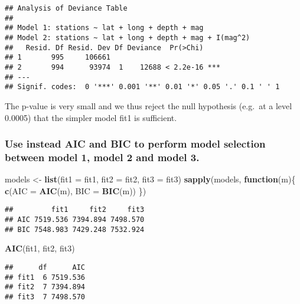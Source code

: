 \documentclass[
]{article}
\newenvironment{Shaded}{\begin{snugshade}}{\end{snugshade}}
\newcommand{\ControlFlowTok}[1]{\textcolor[rgb]{0.13,0.29,0.53}{\textbf{#1}}}
\newcommand{\DataTypeTok}[1]{\textcolor[rgb]{0.13,0.29,0.53}{#1}}
\newcommand{\KeywordTok}[1]{\textcolor[rgb]{0.13,0.29,0.53}{\textbf{#1}}}
\newcommand{\NormalTok}[1]{#1}
\newcommand{\StringTok}[1]{\textcolor[rgb]{0.31,0.60,0.02}{#1}}
\begin{document}
\begin{verbatim}
## Analysis of Deviance Table
## 
## Model 1: stations ~ lat + long + depth + mag
## Model 2: stations ~ lat + long + depth + mag + I(mag^2)
##   Resid. Df Resid. Dev Df Deviance  Pr(>Chi)    
## 1       995     106661                          
## 2       994      93974  1    12688 < 2.2e-16 ***
## ---
## Signif. codes:  0 '***' 0.001 '**' 0.01 '*' 0.05 '.' 0.1 ' ' 1
\end{verbatim}

The p-value is very small and we thus reject the null hypothesis
(e.g.~at a level 0.0005) that the simpler model fit1 is sufficient.

\hypertarget{use-instead-aic-and-bic-to-perform-model-selection-between-model-1-model-2-and-model-3.}{%
\subsubsection{Use instead AIC and BIC to perform model selection
between model 1, model 2 and model
3.}\label{use-instead-aic-and-bic-to-perform-model-selection-between-model-1-model-2-and-model-3.}}

\begin{Shaded}
\begin{Highlighting}[]
\NormalTok{models <-}\StringTok{ }\KeywordTok{list}\NormalTok{(}\DataTypeTok{fit1 =}\NormalTok{ fit1, }\DataTypeTok{fit2 =}\NormalTok{ fit2, }\DataTypeTok{fit3 =}\NormalTok{ fit3)}
\KeywordTok{sapply}\NormalTok{(models, }\ControlFlowTok{function}\NormalTok{(m)\{}
  \KeywordTok{c}\NormalTok{(}\DataTypeTok{AIC =} \KeywordTok{AIC}\NormalTok{(m), }\DataTypeTok{BIC =} \KeywordTok{BIC}\NormalTok{(m))}
\NormalTok{\})}
\end{Highlighting}
\end{Shaded}

\begin{verbatim}
##         fit1     fit2     fit3
## AIC 7519.536 7394.894 7498.570
## BIC 7548.983 7429.248 7532.924
\end{verbatim}

\begin{Shaded}
\begin{Highlighting}[]
\KeywordTok{AIC}\NormalTok{(fit1, fit2, fit3)}
\end{Highlighting}
\end{Shaded}

\begin{verbatim}
##      df      AIC
## fit1  6 7519.536
## fit2  7 7394.894
## fit3  7 7498.570
\end{verbatim}
\end{document}
